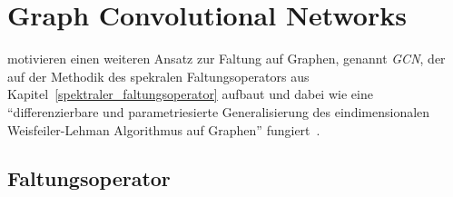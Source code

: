 \section{Graph Convolutional Networks}
\label{graph_convolutional_networks}

\citeauthor{gcn} motivieren einen weiteren Ansatz zur Faltung auf Graphen, genannt \emph{\gls{GCN}}, der auf der Methodik des spekralen Faltungsoperators aus Kapitel~\ref{spektraler_faltungsoperator} aufbaut und dabei wie eine \enquote{differenzierbare und parametriesierte Generalisierung des eindimensionalen Weisfeiler-Lehman Algorithmus auf Graphen} fungiert~\cite{gcn}.

\subsection{Faltungsoperator}
\label{gcn_faltungsoperator}

